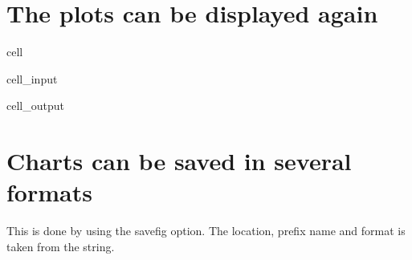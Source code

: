 \documentclass[letterpaper,10pt,english]{jupyterBook}
\begin{document}
\section{The plots can be displayed again}
\label{\detokenize{content/howto/keep/Create and modify charts with keep_plot:the-plots-can-be-displayed-again}}
\begin{sphinxuseclass}{cell}\begin{sphinxVerbatimInput}

\begin{sphinxuseclass}{cell_input}
\begin{sphinxVerbatim}[commandchars=\\\{\}]
   
\end{sphinxVerbatim}

\end{sphinxuseclass}\end{sphinxVerbatimInput}
\begin{sphinxVerbatimOutput}

\begin{sphinxuseclass}{cell_output}
\noindent{}

\noindent{}

\end{sphinxuseclass}\end{sphinxVerbatimOutput}

\end{sphinxuseclass}

\section{Charts can be saved in several formats}
\label{\detokenize{content/howto/keep/Create and modify charts with keep_plot:charts-can-be-saved-in-several-formats}}
\sphinxAtStartPar
This is done by using the savefig option.
The location, prefix name and format is taken from the string.
\end{document}

